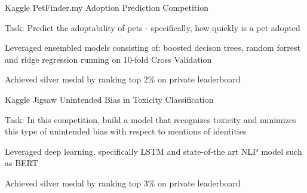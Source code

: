 

\begin{cventries}
  \cventry
    {Kaggle} %
    {PetFinder.my Adoption Prediction Competition} %
    {} %
    {} %
    {
      \begin{cvitems} %
      \item {Task: Predict the adoptability of pets - specifically, how quickly is a pet adopted}
      \item {Leveraged ensembled models consisting of: boosted decison trees, random forrest and ridge regression running on 10-fold Cross Validation}
      \item {Achieved silver medal by ranking top 2\% on private leaderboard}
      \end{cvitems}
    }
  \cventry
    {Kaggle} %
    {Jigsaw Unintended Bias in Toxicity Classification} %
    {} %
    {} %
    {
      \begin{cvitems} %
      \item {Task: In this competition, build a model that recognizes toxicity and minimizes this type of unintended bias with respect to mentions of identities}
      \item {Leveraged deep learning, specifically LSTM and state-of-the art NLP model such as BERT}
      \item {Achieved silver medal by ranking top 3\% on private leaderboard}
      \end{cvitems}
    }
\end{cventries}
